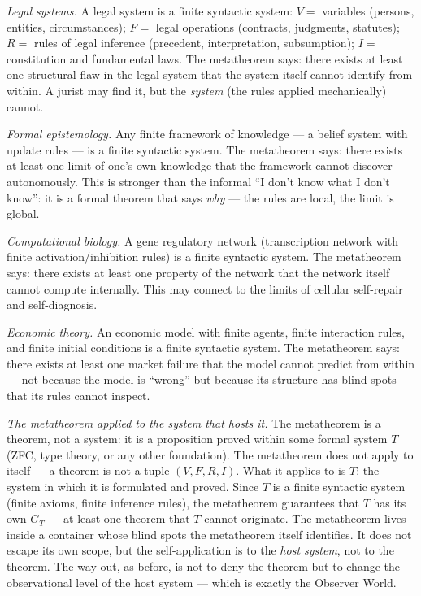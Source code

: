 \documentclass[11pt]{article}
\begin{document}
\smallskip

\emph{Legal systems.}
A legal system is a finite syntactic system: $V =$ variables (persons,
entities, circumstances); $F =$ legal operations (contracts, judgments,
statutes); $R =$ rules of legal inference (precedent, interpretation,
subsumption); $I =$ constitution and fundamental laws. The metatheorem
says: there exists at least one structural flaw in the legal system that
the system itself cannot identify from within. A jurist may find it, but
the \emph{system} (the rules applied mechanically) cannot.

\smallskip

\emph{Formal epistemology.}
Any finite framework of knowledge --- a belief system with update rules
--- is a finite syntactic system. The metatheorem says: there exists at
least one limit of one's own knowledge that the framework cannot
discover autonomously. This is stronger than the informal ``I don't know
what I don't know'': it is a formal theorem that says \emph{why} ---
the rules are local, the limit is global.

\smallskip


\emph{Computational biology.}
A gene regulatory network (transcription network with finite
activation/inhibition rules) is a finite syntactic system. The
metatheorem says: there exists at least one property of the network that
the network itself cannot compute internally. This may connect to the
limits of cellular self-repair and self-diagnosis.

\smallskip

\emph{Economic theory.}
An economic model with finite agents, finite interaction rules, and
finite initial conditions is a finite syntactic system. The metatheorem
says: there exists at least one market failure that the model cannot
predict from within --- not because the model is ``wrong'' but because
its structure has blind spots that its rules cannot inspect.

\smallskip


\emph{The metatheorem applied to the system that hosts it.}
The metatheorem is a theorem, not a system: it is a proposition proved
within some formal system $T$ (ZFC, type theory, or any other
foundation). The metatheorem does not apply to itself --- a theorem is
not a tuple $(V, F, R, I)$. What it applies to is $T$: the system in
which it is formulated and proved. Since $T$ is a finite syntactic
system (finite axioms, finite inference rules), the metatheorem
guarantees that $T$ has its own $G_T$ --- at least one theorem that $T$
cannot originate. The metatheorem lives inside a container whose blind
spots the metatheorem itself identifies. It does not escape its own
scope, but the self-application is to the \emph{host system}, not to the
theorem. The way out, as before, is not to deny the theorem but to
change the observational level of the host system --- which is exactly
the Observer World.
\end{document}
